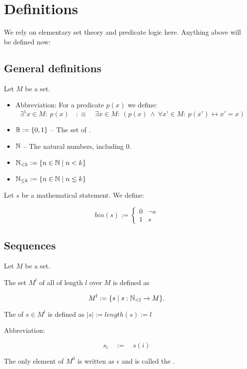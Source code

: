 \chapter{Definitions}


We rely on elementary set theory and predicate logic here. Anything above will be defined now:

\section{General definitions} 


Let $M$ be a set.
\begin{itemize}
\item Abbreviation: For a predicate $p(x)$ we define: \[ \exists^1 x \in M: \: p(x) \quad : \equiv \quad \exists x \in M:\:(p(x) \:  \wedge \: \forall x' \in M : \: p(x') \leftrightarrow x' = x)\]
\item $\mathbb{B} := \lbrace 0, 1 \rbrace$ -- The set of .
\item $\mathbb{N}$ -- The natural numbers, including $0$.
\item $\mathbb{N}_{<k} := \lbrace n \in \mathbb{N} \mid n < k \rbrace$
\item $\mathbb{N}_{\leq k} := \lbrace n \in \mathbb{N} \mid n \leq k \rbrace$
\end{itemize} 

Let $s$ be a mathematical statement. We define:

\[bin(s) := \begin{cases} 0 & \neg s \\ 1 & s\end{cases}\]

\section{Sequences}


Let $M$ be a set.

The set $M^l$ of all  of length $l$ over $M$ is defined as

\[M^l := \lbrace s \mid s: \mathbb{N}_{< l} \rightarrow M \rbrace. \]

The  of $s\in M^l$ is defined as $\vert s \vert  := length(s) := l$

Abbreviation:

\[s_i \quad := \quad s(i) \]

The only element of $M^0$ is written as $\epsilon$ and is called the .

